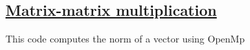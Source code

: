 \documentclass[%
oneside,                 %
final,                   %
10pt]{article}
\begin{document}
\subsection*{\href{{https://github.com/CompPhysics/ComputationalPhysicsMSU/blob/master/doc/Programs/ParallelizationOpenMP/OpenMPvectornorm.cpp}}{Matrix-matrix multiplication}}
This code computes the norm of a vector using OpenMp
\end{document}
